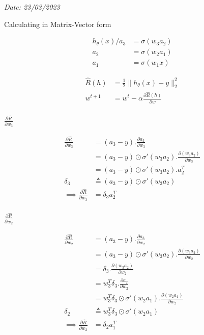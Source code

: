 \documentclass[11pt]{article}
\begin{document}
\textit{Date: 23/03/2023}

\vspace{3mm}

Calculating in Matrix-Vector form
\hfill
{}

\begin{align*}
  h_{\theta}(x)/a_3 &= \sigma (w_3a_2) \\
  a_2 &= \sigma(w_2a_1) \\
  a_1 &= \sigma (w_1x)
\end{align*} 

\begin{align*}
  \hat{R}(h) &= \frac{1}{2} \lVert h_{\theta}(x) - y \rVert_2^2 \\
  w^{t+1} &= w^t - \alpha \frac{\partial \hat{R}(h)}{\partial w} \\
\end{align*}

$\frac{\partial \hat{R}}{\partial w_3}$

\begin{align*}
  \frac{\partial \hat{R}}{\partial w_3} &= (a_3 - y) . \frac{\partial a_3}{\partial w_3} \\
  &= (a_3 - y) \odot \sigma' (w_3a_2) . \frac{\partial (w_3a_2)}{\partial w_3} \\
  &= (a_3 - y) \odot \sigma' (w_3a_2) . a_2^T \\
  \delta_3 &\triangleq (a_3 - y) \odot \sigma' (w_3a_2) \\
  \implies \frac{\partial \hat{R}}{\partial w_3} &= \delta_3 a_2^T \\
\end{align*}

$\frac{\partial \hat{R}}{\partial w_2}$

\begin{align*}
  \frac{\partial \hat{R}}{\partial w_2} &= (a_3 - y) . \frac{\partial a_3}{\partial w_2} \\
  &= (a_3 - y) \odot \sigma' (w_3a_2) . \frac{\partial (w_3a_2)}{\partial w_2} \\
  &= \delta_3 . \frac{\partial (w_3a_2)}{\partial w_2} \\
  &= w_3^T\delta_3 . \frac{\partial a_2}{\partial w_2} \\
  &= w_3^T\delta_3 \odot \sigma' (w_2a_1) . \frac{\partial (w_2a_1)}{\partial w_2} \\
  \delta_2 &\triangleq w_3^T\delta_3 \odot \sigma' (w_2a_1) \\
  \implies \frac{\partial \hat{R}}{\partial w_2} &= \delta_2 a_1^T\\
\end{align*}
\end{document}
